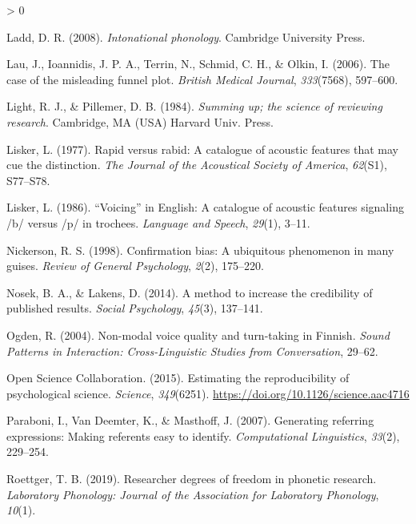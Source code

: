 \documentclass[
  english,
  man,floatsintext]{apa6}
\newlength{\cslhangindent}
\newenvironment{CSLReferences}[2] %
 {%
  \setlength{\parindent}{0pt}
  \ifodd #1 \everypar{\setlength{\hangindent}{\cslhangindent}}\ignorespaces\fi
  \ifnum #2 > 0
  \setlength{\parskip}{#2\baselineskip}
  \fi
 }%
 {}
\begin{document}
\begin{CSLReferences}{1}{0}
\leavevmode\hypertarget{ref-ladd2008intonational}{}%
Ladd, D. R. (2008). \emph{Intonational phonology}. Cambridge University Press.

\leavevmode\hypertarget{ref-lau2006}{}%
Lau, J., Ioannidis, J. P. A., Terrin, N., Schmid, C. H., \& Olkin, I. (2006). The case of the misleading funnel plot. \emph{British Medical Journal}, \emph{333}(7568), 597--600.

\leavevmode\hypertarget{ref-light1984}{}%
Light, R. J., \& Pillemer, D. B. (1984). \emph{Summing up; the science of reviewing research}. Cambridge, MA (USA) Harvard Univ. Press.

\leavevmode\hypertarget{ref-lisker1977rapid}{}%
Lisker, L. (1977). Rapid versus rabid: A catalogue of acoustic features that may cue the distinction. \emph{The Journal of the Acoustical Society of America}, \emph{62}(S1), S77--S78.

\leavevmode\hypertarget{ref-lisker1986voicing}{}%
Lisker, L. (1986). {``Voicing''} in {E}nglish: A catalogue of acoustic features signaling /b/ versus /p/ in trochees. \emph{Language and Speech}, \emph{29}(1), 3--11.

\leavevmode\hypertarget{ref-nickerson1998confirmation}{}%
Nickerson, R. S. (1998). Confirmation bias: A ubiquitous phenomenon in many guises. \emph{Review of General Psychology}, \emph{2}(2), 175--220.

\leavevmode\hypertarget{ref-nosek2014method}{}%
Nosek, B. A., \& Lakens, D. (2014). A method to increase the credibility of published results. \emph{Social Psychology}, \emph{45}(3), 137--141.

\leavevmode\hypertarget{ref-ogden2004}{}%
Ogden, R. (2004). Non-modal voice quality and turn-taking in {F}innish. \emph{Sound Patterns in Interaction: Cross-Linguistic Studies from Conversation}, 29--62.

\leavevmode\hypertarget{ref-open2015estimating}{}%
Open Science Collaboration. (2015). Estimating the reproducibility of psychological science. \emph{Science}, \emph{349}(6251). \url{https://doi.org/10.1126/science.aac4716}

\leavevmode\hypertarget{ref-paraboni2007generating}{}%
Paraboni, I., Van Deemter, K., \& Masthoff, J. (2007). Generating referring expressions: Making referents easy to identify. \emph{Computational Linguistics}, \emph{33}(2), 229--254.

\leavevmode\hypertarget{ref-roettger2019researcher}{}%
Roettger, T. B. (2019). Researcher degrees of freedom in phonetic research. \emph{Laboratory Phonology: Journal of the Association for Laboratory Phonology}, \emph{10}(1).


\end{CSLReferences}
\end{document}
